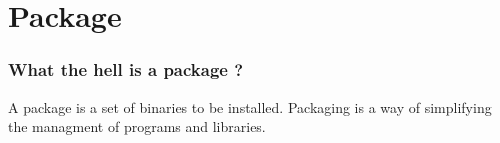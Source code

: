 \section{Package}
\begin{frame}
    \frametitle{What the hell is a package ?}
    A package is a set of binaries to be installed.
    Packaging is a way of simplifying the managment of programs and libraries.
\end{frame}
